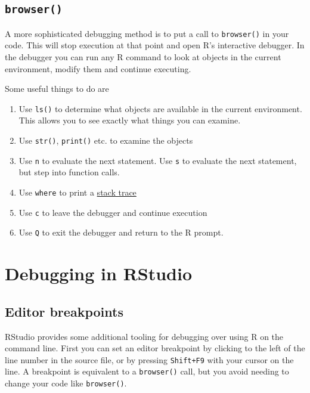 \documentclass[
  letterpaper,
]{book}
\providecommand{\tightlist}{%
  \setlength{\itemsep}{0pt}\setlength{\parskip}{0pt}}\usepackage{longtable,booktabs,array}
\begin{document}
\hypertarget{browser}{%
\subsection*{\texorpdfstring{\texttt{browser()}}{browser()}}\label{browser}}

A more sophisticated debugging method is to put a call to
\texttt{browser()} in your code. This will stop execution at that point
and open R's interactive debugger. In the debugger you can run any R
command to look at objects in the current environment, modify them and
continue executing.

Some useful things to do are

\begin{enumerate}
\def\labelenumi{\arabic{enumi}.}
\tightlist
\item
  Use \texttt{ls()} to determine what objects are available in the
  current environment. This allows you to see exactly what things you
  can examine.
\item
  Use \texttt{str()}, \texttt{print()} etc. to examine the objects
\item
  Use \texttt{n} to evaluate the next statement. Use \texttt{s} to
  evaluate the next statement, but step into function calls.
\item
  Use \texttt{where} to print a \protect\hyperlink{traceback}{stack
  trace}
\item
  Use \texttt{c} to leave the debugger and continue execution
\item
  Use \texttt{Q} to exit the debugger and return to the R prompt.
\end{enumerate}

\hypertarget{debugging-in-rstudio}{%
\section*{Debugging in RStudio}\label{debugging-in-rstudio}}

\hypertarget{editor-breakpoints}{%
\subsection*{Editor breakpoints}\label{editor-breakpoints}}

RStudio provides some additional tooling for debugging over using R on
the command line. First you can set an editor breakpoint by clicking to
the left of the line number in the source file, or by pressing
\texttt{Shift+F9} with your cursor on the line. A breakpoint is
equivalent to a \texttt{browser()} call, but you avoid needing to change
your code like \texttt{browser()}.
\end{document}
